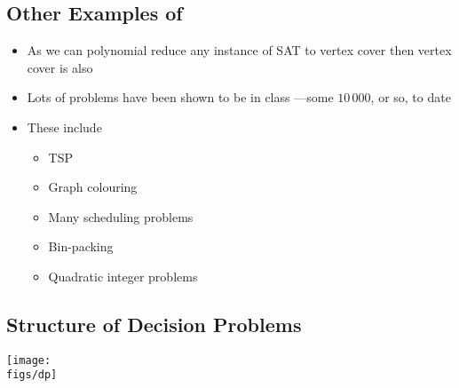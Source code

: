 \begin{slide}
\section[-1]{Other Examples of }

\begin{PauseHighLight}
  \begin{itemize}
  \item As we can polynomial reduce any instance of SAT to vertex cover
    then vertex cover is also \pause
  \item Lots of problems have been shown to be in class
    \pause---some $10\,000$, or so, to date\pause
  \item These include
    \begin{itemize}
    \item TSP\pause
    \item Graph colouring\pause
    \item Many scheduling problems\pause
    \item Bin-packing\pause
    \item Quadratic integer problems\pause
    \end{itemize}
  \end{itemize}
\end{PauseHighLight}

\end{slide}



\begin{slide}
\section{Structure of Decision Problems}

\begin{center}
  \texttt{[image: \\figs/dp]}
\end{center}

\end{slide}


